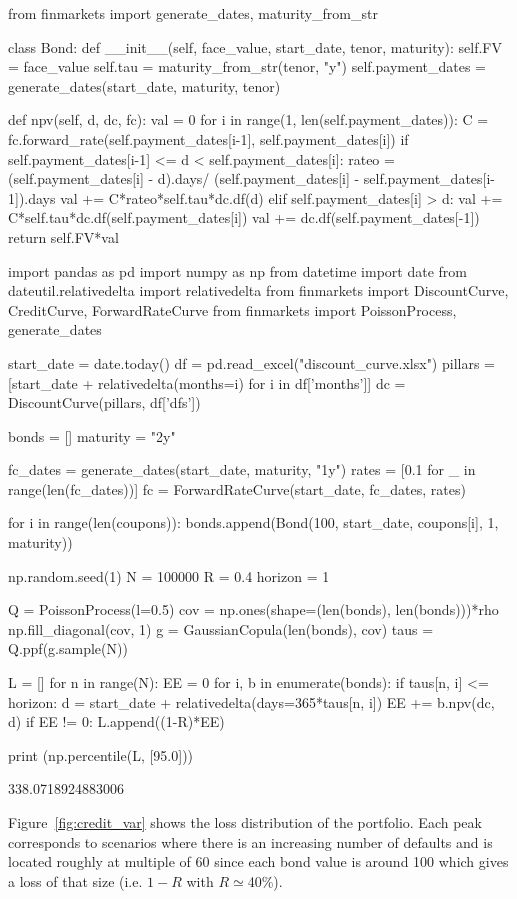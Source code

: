 \begin{ipython}
from finmarkets import generate_dates, maturity_from_str

class Bond:
    def __init__(self, face_value, start_date, tenor, maturity):
        self.FV = face_value
        self.tau = maturity_from_str(tenor, "y")
        self.payment_dates = generate_dates(start_date, maturity, tenor)

    def npv(self, d, dc, fc):
        val = 0
        for i in range(1, len(self.payment_dates)):
            C = fc.forward_rate(self.payment_dates[i-1], self.payment_dates[i])
            if self.payment_dates[i-1] <= d < self.payment_dates[i]:
                rateo = (self.payment_dates[i] - d).days/
                (self.payment_dates[i] - self.payment_dates[i-1]).days
                val += C*rateo*self.tau*dc.df(d)
            elif self.payment_dates[i] > d:
                val += C*self.tau*dc.df(self.payment_dates[i])
                val += dc.df(self.payment_dates[-1])
        return self.FV*val
\end{ipython}
\begin{ipython}
import pandas as pd
import numpy as np
from datetime import date
from dateutil.relativedelta import relativedelta
from finmarkets import DiscountCurve, CreditCurve, ForwardRateCurve
from finmarkets import PoissonProcess, generate_dates
    
start_date = date.today()
df = pd.read_excel("discount_curve.xlsx")
pillars = [start_date + relativedelta(months=i) for i in df['months']]
dc = DiscountCurve(pillars, df['dfs'])

bonds = []
maturity = "2y"

fc_dates = generate_dates(start_date, maturity, "1y")
rates = [0.1 for _ in range(len(fc_dates))]
fc = ForwardRateCurve(start_date, fc_dates, rates)

for i in range(len(coupons)):
    bonds.append(Bond(100, start_date, coupons[i], 1, maturity))

np.random.seed(1)
N = 100000
R = 0.4
horizon = 1

Q = PoissonProcess(l=0.5)
cov = np.ones(shape=(len(bonds), len(bonds)))*rho
np.fill_diagonal(cov, 1)
g = GaussianCopula(len(bonds), cov)
taus = Q.ppf(g.sample(N))

L = []
for n in range(N):
    EE = 0
    for i, b in enumerate(bonds):
        if taus[n, i] <= horizon:
            d = start_date + relativedelta(days=365*taus[n, i])
            EE += b.npv(dc, d)
    if EE != 0:
        L.append((1-R)*EE)
  
print (np.percentile(L, [95.0]))
\end{ipython}
\begin{ioutput}
338.0718924883006
\end{ioutput}
\noindent
Figure~\ref{fig:credit_var} shows the loss distribution of the portfolio. Each peak corresponds to scenarios where there is an increasing number of defaults and is located roughly at multiple of 60 since each bond value is around 100 which gives a loss of that size (i.e. $1-R$ with $R\simeq$40\%). 

